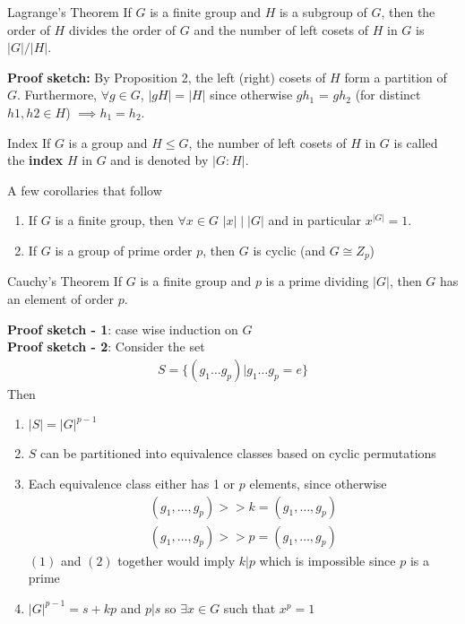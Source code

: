 \documentclass[titlepage, 12pt]{book}
\begin{document}
\begin{theorem}{Lagrange's Theorem}{}
    If $G$ is a finite group and $H$ is a subgroup of $G$, then the order of $H$
    divides the order of $G$ and the number of left cosets of $H$ in $G$ is
    $|G|/|H|$.
\end{theorem}
\textbf{Proof sketch:} By Proposition 2, the left (right) cosets of $H$ form a
partition of $G$. Furthermore, $\forall g\in G$, $|gH| = |H|$ since otherwise
$gh_1$ = $gh_2$ (for distinct $h1, h2\in H$) $\implies h_1 = h_2$.
\begin{definition}{Index}{}
    If $G$ is a group and $H\le G$, the number of left cosets of $H$ in $G$ is
    called the \textbf{index} $H$ in $G$ and is denoted by $|G:H|$.
\end{definition}
A few corollaries that follow
\begin{enumerate}
    \item If $G$ is a finite group, then $\forall x\in G$ $|x|\mid |G|$ and in
        particular $x^{|G|} = 1$.
    \item If $G$ is a group of prime order $p$, then $G$ is cyclic (and $G\cong
        Z_p$)
\end{enumerate}
\begin{theorem}{Cauchy's Theorem}{}
    If $G$ is a finite group and $p$ is a prime dividing $|G|$, then $G$ has an
    element of order $p$.
\end{theorem}
\textbf{Proof sketch - 1}: case wise induction on $G$\\
\textbf{Proof sketch - 2}: Consider the set
\begin{gather*}
    S = \{(g_1\dots g_p) | g_1\dots g_p = e\}
\end{gather*}
Then
\begin{enumerate}
    \item $|S| = |G|^{p-1}$
    \item $S$ can be partitioned into equivalence classes based on cyclic
        permutations
    \item Each equivalence class either has 1 or $p$ elements, since otherwise
        \begin{gather}
            (g_1,\dots,g_p)>>k = (g_1,\dots,g_p)\\
            (g_1,\dots,g_p)>>p = (g_1,\dots,g_p)
        \end{gather}
        $(1)$ and $(2)$ together would imply $k|p$ which is impossible since $p$
        is a prime
    \item $|G|^{p-1} = s + kp$ and $p|s$ so $\exists x\in G$ such that $x^p = 1$
\end{enumerate}
\end{document}
